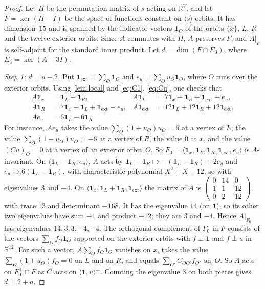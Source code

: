 \documentclass[11pt,a4paper]{amsart}
\theoremstyle{definition}
\theoremstyle{remark}
\newcommand{\R}{\mathbb{R}}
\newcommand{\one}{\mathbf{1}}
\begin{document}
\begin{proof}
Let $\Pi$ be the permutation matrix of $s$ acting on $\R^V$, and let $F=\ker(\Pi-I)$ be the space of functions
constant on $\langle s\rangle$-orbits. It has dimension~$15$ and is spanned by the indicator vectors $\one_O$ of
the orbits $\{x\}$, $L$, $R$ and the twelve exterior orbits. Since $A$ commutes with $\Pi$, $A$ preserves
$F$, and $A|_F$ is self-adjoint for the standard inner product. Let $d=\dim(F\cap E_3)$, where
$E_3=\ker(A-3I)$.

\emph{Step 1: $d=a+2$.} Put $\one_{\mathrm{ext}}=\sum_{O}\one_O$ and $e_u=\sum_O u_O\one_O$, where $O$ runs
over the exterior orbits. Using \cref{lem:local} and \eqref{eq:C1}, \eqref{eq:Cu}, one checks that
\begin{align*}
A\one_x&=\one_L+\one_R, & A\one_L&=7\one_x+\one_R+\one_{\mathrm{ext}}+e_u,\\
A\one_R&=7\one_x+\one_L+\one_{\mathrm{ext}}-e_u, & A\one_{\mathrm{ext}}&=12\one_L+12\one_R+12\one_{\mathrm{ext}},\\
Ae_u&=6\one_L-6\one_R .
\end{align*}
For instance, $Ae_u$ takes the value $\sum_O(1+u_O)u_O=6$ at a vertex of $L$, the value
$\sum_O(1-u_O)u_O=-6$ at a vertex of $R$, the value $0$ at $x$, and the value $(Cu)_O=0$ at a vertex of an
exterior orbit~$O$. So $F_0=\langle\one_x,\one_L,\one_R,\one_{\mathrm{ext}},e_u\rangle$ is $A$-invariant. On
$\langle\one_L-\one_R,e_u\rangle$, $A$ acts by $\one_L-\one_R\mapsto-(\one_L-\one_R)+2e_u$ and
$e_u\mapsto6(\one_L-\one_R)$, with characteristic polynomial $X^2+X-12$, so with eigenvalues $3$ and $-4$. On
$\langle\one_x,\one_L+\one_R,\one_{\mathrm{ext}}\rangle$ the matrix of $A$ is
$\left(\begin{smallmatrix}0&14&0\\1&1&12\\0&2&12\end{smallmatrix}\right)$, with trace $13$ and determinant
$-168$. It has the eigenvalue $14$ (on $\one$), so its other two eigenvalues have sum $-1$ and product $-12$;
they are $3$ and $-4$. Hence $A|_{F_0}$ has eigenvalues $14,3,3,-4,-4$. The orthogonal complement of $F_0$ in $F$ consists of the vectors $\sum_O f_O\one_O$
supported on the exterior orbits with $f\perp\one$ and $f\perp u$ in $\R^{12}$. For such a vector,
$A\sum_Of_O\one_O$ vanishes on $x$, takes the value $\sum_O(1\pm u_O)f_O=0$ on $L$ and on $R$, and
equals $\sum_{O'}C_{OO'}f_{O'}$ on~$O$. So $A$ acts on $F_0^\perp\cap F$ as $C$ acts on
$\langle\one,u\rangle^\perp$. Counting the eigenvalue $3$ on both pieces gives $d=2+a$.


\end{proof}
\end{document}
